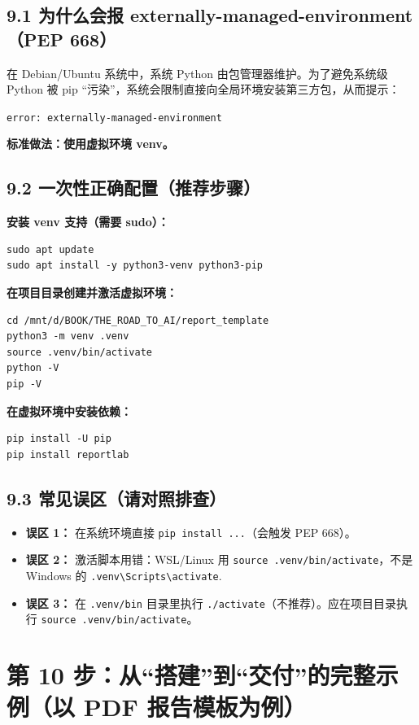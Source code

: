 \documentclass[11pt,a4paper]{article}
\begin{document}
\subsection{9.1 为什么会报 externally-managed-environment（PEP 668）}
在 Debian/Ubuntu 系统中，系统 Python 由包管理器维护。为了避免系统级 Python 被 pip ``污染''，系统会限制直接向全局环境安装第三方包，从而提示：
\begin{center}
\texttt{error: externally-managed-environment}
\end{center}
\textbf{标准做法：使用虚拟环境 venv。}

\subsection{9.2 一次性正确配置（推荐步骤）}
\textbf{安装 venv 支持（需要 sudo）：}
\begin{lstlisting}
sudo apt update
sudo apt install -y python3-venv python3-pip
\end{lstlisting}

\textbf{在项目目录创建并激活虚拟环境：}
\begin{lstlisting}
cd /mnt/d/BOOK/THE_ROAD_TO_AI/report_template
python3 -m venv .venv
source .venv/bin/activate
python -V
pip -V
\end{lstlisting}

\textbf{在虚拟环境中安装依赖：}
\begin{lstlisting}
pip install -U pip
pip install reportlab
\end{lstlisting}

\subsection{9.3 常见误区（请对照排查）}
\begin{itemize}[leftmargin=1.5em]
  \item \textbf{误区 1：} 在系统环境直接 \texttt{pip install ...}（会触发 PEP 668）。
  \item \textbf{误区 2：} 激活脚本用错：WSL/Linux 用 \texttt{source .venv/bin/activate}，不是 Windows 的 \texttt{.venv\textbackslash Scripts\textbackslash activate}.
  \item \textbf{误区 3：} 在 \texttt{.venv/bin} 目录里执行 \texttt{./activate}（不推荐）。应在项目目录执行 \texttt{source .venv/bin/activate}。
\end{itemize}

\section{第 10 步：从“搭建”到“交付”的完整示例（以 PDF 报告模板为例）}
\end{document}
